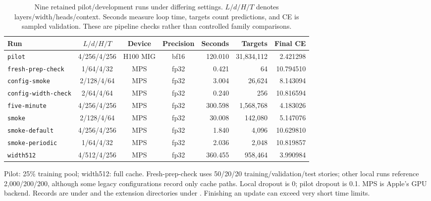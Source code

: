 \begin{table}[t]
\centering\small
\setlength{\tabcolsep}{4pt}
\caption{Nine retained pilot/development runs under differing settings. $L/d/H/T$ denotes layers/width/heads/context. Seconds measure loop time, targets count predictions, and CE is sampled validation. These are pipeline checks rather than controlled family comparisons.}
\label{tab:development2}
\begin{tabular}{lcccrrr}
\toprule
Run & $L/d/H/T$ & Device & Precision & Seconds & Targets & Final CE\\
\midrule
\texttt{pilot} & 4/256/4/256 & H100 MIG & bf16 & 120.010 & 31,834,112 & 2.421298\\
\texttt{fresh-prep-check} & 1/64/4/32 & MPS & fp32 & 0.421 & 64 & 10.794510\\
\texttt{config-smoke} & 2/128/4/64 & MPS & fp32 & 3.004 & 26,624 & 8.143094\\
\texttt{config-width-check} & 2/64/4/64 & MPS & fp32 & 0.240 & 256 & 10.816594\\
\texttt{five-minute} & 4/256/4/256 & MPS & fp32 & 300.598 & 1,568,768 & 4.183026\\
\texttt{smoke} & 2/128/4/64 & MPS & fp32 & 30.008 & 142,080 & 5.147076\\
\texttt{smoke-default} & 4/256/4/256 & MPS & fp32 & 1.840 & 4,096 & 10.629810\\
\texttt{smoke-periodic} & 1/64/4/32 & MPS & fp32 & 2.036 & 2,048 & 10.819857\\
\texttt{width512} & 4/512/4/256 & MPS & fp32 & 360.455 & 958,464 & 3.990984\\
\bottomrule
\end{tabular}

\smallskip
\begin{minipage}{\textwidth}
\footnotesize
Pilot: 25\% training pool; width512: full cache. Fresh-prep-check uses
50/20/20 training/validation/test stories; other local runs reference 2,000/200/200,
although some legacy configurations record only cache paths. Local dropout is 0;
pilot dropout is 0.1. MPS is Apple's GPU backend. Records are under
 and the extension directories under . Finishing an update
can exceed very short time limits.
\end{minipage}
\end{table}
